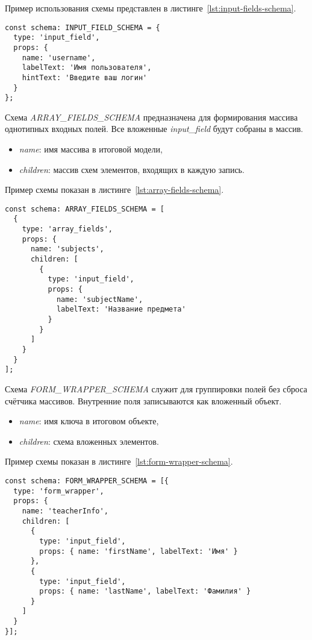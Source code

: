 Пример использования схемы представлен в листинге~\ref{lst:input-fields-schema}.

\begin{lstlisting}[caption={Пример INPUT\_FIELD\_SCHEMA},label={lst:input-fields-schema}]
const schema: INPUT_FIELD_SCHEMA = {
  type: 'input_field',
  props: {
    name: 'username',
    labelText: 'Имя пользователя',
    hintText: 'Введите ваш логин'
  }
};
\end{lstlisting}

Схема \textit{ARRAY\_FIELDS\_SCHEMA} предназначена для формирования массива однотипных входных полей. Все вложенные \textit{input\_field} будут собраны в массив.

\begin{itemize}
  \item \textit{name}: имя массива в итоговой модели,
  \item \textit{children}: массив схем элементов, входящих в каждую запись.
\end{itemize}

Пример схемы показан в листинге~\ref{lst:array-fields-schema}.

\begin{lstlisting}[caption={Пример \textit{ARRAY\_FIELDS\_SCHEMA}},label={lst:array-fields-schema}]
const schema: ARRAY_FIELDS_SCHEMA = [
  {
    type: 'array_fields',
    props: {
      name: 'subjects',
      children: [
        {
          type: 'input_field',
          props: {
            name: 'subjectName',
            labelText: 'Название предмета'
          }
        }
      ]
    }
  }
];
\end{lstlisting}

Схема \textit{FORM\_WRAPPER\_SCHEMA} служит для группировки полей без сброса счётчика массивов. Внутренние поля записываются как вложенный объект.

\begin{itemize}
  \item \textit{name}: имя ключа в итоговом объекте,
  \item \textit{children}: схема вложенных элементов.
\end{itemize}

Пример схемы показан в листинге~\ref{lst:form-wrapper-schema}.

\begin{lstlisting}[caption={Пример \textit{FORM\_WRAPPER\_SCHEMA}},label={lst:form-wrapper-schema}]
const schema: FORM_WRAPPER_SCHEMA = [{
  type: 'form_wrapper',
  props: {
    name: 'teacherInfo',
    children: [
      {
        type: 'input_field',
        props: { name: 'firstName', labelText: 'Имя' }
      },
      {
        type: 'input_field',
        props: { name: 'lastName', labelText: 'Фамилия' }
      }
    ]
  }
}];
\end{lstlisting}

